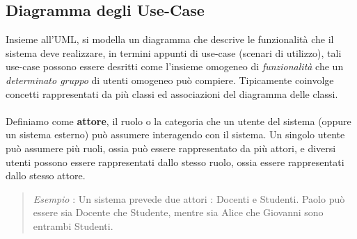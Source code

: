 \documentclass[12pt, letterpaper]{article}
\newcommand{\acc}{\\\hphantom{}\\}
\begin{document}
\subsection{Diagramma degli Use-Case}
Insieme all'UML, si modella un diagramma che descrive le funzionalità che il sistema deve realizzare, in termini appunti 
di use-case (scenari di utilizzo), tali use-case possono essere desritti come l'insieme omogeneo di 
\textit{funzionalità} che un \textit{determinato gruppo} di utenti omogeneo può compiere. Tipicamente coinvolge 
concetti rappresentati da più classi ed associazioni del diagramma delle classi.\acc 
Definiamo come \textbf{attore}, il ruolo o la categoria che un utente del sistema (oppure un sistema esterno) può assumere interagendo 
con il sistema. Un singolo utente può assumere più ruoli, ossia può essere rappresentato da più attori, e diversi utenti 
possono essere rappresentati dallo stesso ruolo, ossia essere rappresentati dallo stesso attore.\begin{quote}
    \textit{Esempio} : Un sistema prevede due attori : Docenti e Studenti. Paolo può essere sia Docente che Studente, mentre 
    sia Alice che Giovanni sono entrambi Studenti.
\end{quote}
\end{document}
